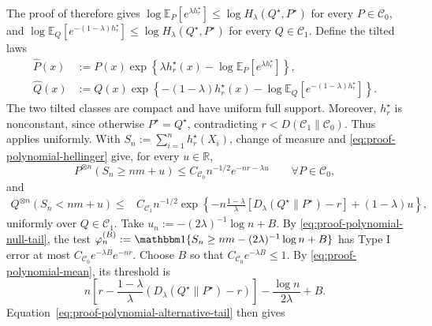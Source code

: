 \documentclass[journal,10pt,draftclsnofoot,onecolumn]{IEEEtran}
\begin{document}
\begin{IEEEproof}
The proof of  therefore gives $\log\mathbb E_P[e^{\lambda h_r^\star}] \leq\log H_\lambda(Q^\star,P^\star)$ for every $P\in\mathcal C_0$, and $\log\mathbb E_Q[e^{-(1-\lambda)h_r^\star}] \leq\log H_\lambda(Q^\star,P^\star)$ for every $Q\in\mathcal C_1$. Define the tilted laws
\begin{equation*}
\begin{aligned} 
\widehat P(x) &:= P(x)\exp\left\{ \lambda h_r^\star(x) -\log\mathbb E_P[e^{\lambda h_r^\star}] \right\}, \\ \widehat Q(x) &:= Q(x)\exp\left\{ -(1-\lambda)h_r^\star(x) -\log\mathbb E_Q[e^{-(1-\lambda)h_r^\star}] \right\}.
\end{aligned}
\end{equation*} 
The two tilted classes are compact and have uniform full support. Moreover, $h_r^\star$ is nonconstant, since otherwise $P^\star=Q^\star$, contradicting $r<D(\mathcal C_1\|\mathcal C_0)$. Thus  applies uniformly. With $S_n:=\sum_{i=1}^n h_r^\star(X_i)$, change of measure and \eqref{eq:proof-polynomial-hellinger} give, for every $u\in\mathbb R$,
\begin{equation} 
P^{\otimes n}(S_n\geq nm+u) \leq C_{\mathcal C_0}n^{-1/2}e^{-nr-\lambda u} \qquad \forall P\in\mathcal C_0,
\label{eq:proof-polynomial-null-tail}
\end{equation}
and
\begin{equation}
\begin{aligned} 
Q^{\otimes n}(S_n<nm+u) \leq{}& C_{\mathcal C_1}n^{-1/2} \exp\left\{ -n\frac{1-\lambda}{\lambda} [D_\lambda(Q^\star\|P^\star)-r] +(1-\lambda)u \right\},
\end{aligned}
\label{eq:proof-polynomial-alternative-tail}
\end{equation}
uniformly over $Q\in\mathcal C_1$. Take $u_n:=-(2\lambda)^{-1}\log n+B$. By \eqref{eq:proof-polynomial-null-tail}, the test $\varphi_n^{(B)} :=\mathbbm 1\{S_n\geq nm-(2\lambda)^{-1}\log n+B\}$ has Type I error at most $C_{\mathcal C_0}e^{-\lambda B}e^{-nr}$. Choose $B$ so that $C_{\mathcal C_0}e^{-\lambda B}\leq1$. By \eqref{eq:proof-polynomial-mean}, its threshold is
\begin{equation*} 
n\left[ r-\frac{1-\lambda}{\lambda} (D_\lambda(Q^\star\|P^\star)-r) \right] -\frac{\log n}{2\lambda} +B.
\end{equation*}
Equation~\eqref{eq:proof-polynomial-alternative-tail} then gives
\begin{equation*}
\begin{aligned} 

\end{aligned}
\end{equation*}
\end{IEEEproof}
\end{document}
